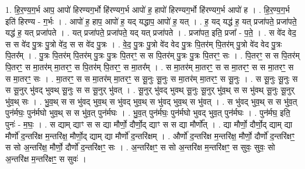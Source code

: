 \documentclass[17pt]{extarticle}
\begin{document}
1. हि॒र॒ण्य॒ग॒र्भ आप॒ आपो॑ हिरण्यग॒र्भो हि॑रण्यग॒र्भ आपो॑ ह॒ हापो॑ हिरण्यग॒र्भो हि॑रण्यग॒र्भ आपो॑ ह । . हि॒र॒ण्य॒ग॒र्भ इति॑ हिरण्य - ग॒र्भः । . आपो॑ ह॒ हाप॒ आपो॑ ह॒ यद् यद्धाप॒ आपो॑ ह॒ यत् । . ह॒ यद् यद्ध॑ ह॒ यत् प्रजा॑पते॒ प्रजा॑पते॒ यद्ध॑ ह॒ यत् प्रजा॑पते । . यत् प्रजा॑पते॒ प्रजा॑पते॒ यद् यत् प्रजा॑पते । . प्रजा॑पत॒ इति॒ प्रजा᳚ - प॒ते॒ । . स वे॑द वेद॒ स स वे॑द पु॒त्रः पु॒त्रो वे॑द॒ स स वे॑द पु॒त्रः । . वे॒द॒ पु॒त्रः पु॒त्रो वे॑द वेद पु॒त्रः पि॒तर॑म् पि॒तर॑म् पु॒त्रो वे॑द वेद पु॒त्रः पि॒तर᳚म् । . पु॒त्रः पि॒तर॑म् पि॒तर॑म् पु॒त्रः पु॒त्रः पि॒तरꣳ॒॒ स स पि॒तर॑म् पु॒त्रः पु॒त्रः पि॒तरꣳ॒॒ सः । . पि॒तरꣳ॒॒ स स पि॒तर॑म् पि॒तरꣳ॒॒ स मा॒तर॑म् मा॒तरꣳ॒॒ स पि॒तर॑म् पि॒तरꣳ॒॒ स मा॒तर᳚म् । . स मा॒तर॑म् मा॒तरꣳ॒॒ स स मा॒तरꣳ॒॒ स स मा॒तरꣳ॒॒ स स मा॒तरꣳ॒॒ सः । . मा॒तरꣳ॒॒ स स मा॒तर॑म् मा॒तरꣳ॒॒ स सू॒नुः सू॒नुः स मा॒तर॑म् मा॒तरꣳ॒॒ स सू॒नुः । . स सू॒नुः सू॒नुः स स सू॒नुर् भु॑वद् भुवथ् सू॒नुः स स सू॒नुर् भु॑वत् । . सू॒नुर् भु॑वद् भुवथ् सू॒नुः सू॒नुर् भु॑व॒थ् स स भु॑वथ् सू॒नुः सू॒नुर् भु॑व॒थ् सः । . भु॒व॒थ् स स भु॑वद् भुव॒थ् स भु॑वद् भुव॒थ् स भु॑वद् भुव॒थ् स भु॑वत् । . स भु॑वद् भुव॒थ् स स भु॑व॒त् पुन॑र्मघः॒ पुन॑र्मघो भुव॒थ् स स भु॑व॒त् पुन॑र्मघः । . भु॒व॒त् पुन॑र्मघः॒ पुन॑र्मघो भुवद् भुव॒त् पुन॑र्मघः । . पुन॑र्मघ॒ इति॒ पुनः॑ - म॒घः॒ । . स द्याम् द्याꣳ स स द्या मौर्णो॒ दौर्णो॒द् द्याꣳ स स द्या मौर्णो᳚त् । . द्या मौर्णो॒ दौर्णो॒द् द्याम् द्या मौर्णो॑ द॒न्तरि॑क्ष म॒न्तरि॑क्ष॒ मौर्णो॒द् द्याम् द्या मौर्णो॑ द॒न्तरि॑क्षम् । . और्णो॑ द॒न्तरि॑क्ष म॒न्तरि॑क्ष॒ मौर्णो॒ दौर्णो॑ द॒न्तरि॑क्षꣳ॒॒ स सो अ॒न्तरि॑क्ष॒ मौर्णो॒ दौर्णो॑ द॒न्तरि॑क्षꣳ॒॒ सः । . अ॒न्तरि॑क्षꣳ॒॒ स सो अ॒न्तरि॑क्ष म॒न्तरि॑क्षꣳ॒॒ स सुवः॒ सुवः॒ सो अ॒न्तरि॑क्ष म॒न्तरि॑क्षꣳ॒॒ स सुवः॑ । \newline
\end{document}
